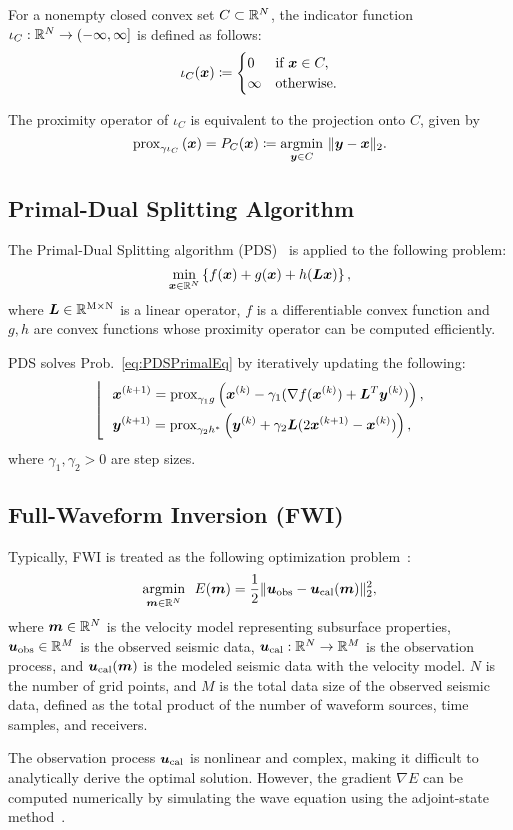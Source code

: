 For a nonempty closed convex set $C \subset \mathbb{R}^N$, the indicator function $\iota_C: \mathbb{R}^N \to (- \infty, \infty] $ is defined as follows:
\begin{equation} \label{eq:IndicatorFunctionDefinitionEq} \iota_{C}(\bm{x}) \coloneq \begin{cases} 0 & \text{if } \bm{x} \in C, \\ \infty & \text{otherwise}. \end{cases} \end{equation}

The proximity operator of $\iota_C$ is equivalent to the projection onto $C$, given by
\vspace{-1.4mm}
\begin{equation} \label{eq:ProximityOperatorDefinitionWithIndicatorFunctionEq}
\mathrm{prox}_{ \gamma \iota_{C} }\left(\bm{x}\right) = P_C(\bm{x}) \coloneq \underset{\bm{y} \in C}{\mathrm{argmin}} \ \lVert \bm{y} - \bm{x} \rVert _2.
\end{equation}



\subsection{Primal-Dual Splitting Algorithm} \label{subsec:primal-dual-splitting-algorithm}

The Primal-Dual Splitting algorithm (PDS)~\cite{PDS2} is applied to the following problem:
\begin{equation} \label{eq:PDSPrimalEq} \underset{ \bm{x} \in \mathbb{R}^N }{\mathrm{min}} \left\{ f(\bm{x}) + g(\bm{x}) + h(\bm{L} \bm{x}) \right\}, \end{equation}
where $\bm{L} \in \mathbb{R}^{\mathrm{M} \times \mathrm{N}}$ is a linear operator, $f$ is a differentiable convex function and $g,h$ are convex functions whose proximity operator can be computed efficiently.

PDS solves Prob.~\eqref{eq:PDSPrimalEq} by iteratively updating the following:
\begin{equation} \label{eq:PDSSubStep} \left \lfloor \ \ \begin{aligned} & \bm{x}^{(k+1)} = \mathrm{prox}_{\gamma_1 g}\left(\bm{x}^{(k)} - \gamma_1( \nabla f(\bm{x}^{(k)}) + \bm{L}^T \bm{y}^{(k)} )\right), \\ & \bm{y}^{(k+1)} = \mathrm{prox}_{\gamma_2 h^*}\left(\bm{y}^{(k)} + \gamma_2 \bm{L} (2\bm{x}^{(k+1)} - \bm{x}^{(k)}) \right), \\ \end{aligned} \right. \end{equation}
where $\gamma_1, \gamma_2 > 0$ are step sizes.


\subsection{Full-Waveform Inversion (FWI)} \label{subsec:full-waveform-inversion}

Typically, FWI is treated as the following optimization problem~\cite{FWI0}:
\begin{equation} \label{eq:FWIObjective} \underset{\bm{m} \in \mathbb{R}^N}{\mathrm{argmin}} \ \ E(\bm{m}) = \frac {1} {2} \lVert  \bm{u}_{\mathrm{obs}} - \bm{u}_{\mathrm{cal}}(\bm{m})  \rVert _2^2, \end{equation}
where $\bm{m} \in \mathbb{R}^{N}$ is the velocity model representing subsurface properties, $\bm{u}_{\mathrm{obs}} \in \mathbb{R}^{M}$ is the observed seismic data, $\bm{u}_{\mathrm{cal}} : \mathbb{R}^{N} \rightarrow \mathbb{R}^{M}$ is the observation process, and $\bm{u}_{\mathrm{cal}}(\bm{m})$ is the modeled seismic data with the velocity model.
$N$ is the number of grid points, and $M$ is the total data size of the observed seismic data, defined as the total product of the number of waveform sources, time samples, and receivers.

The observation process $\bm{u}_{\mathrm{cal}}$ is nonlinear and complex, making it difficult to analytically derive the optimal solution.
However, the gradient $\nabla E$ can be computed numerically by simulating the wave equation using the adjoint-state method~\cite{FWI-gradient}.
